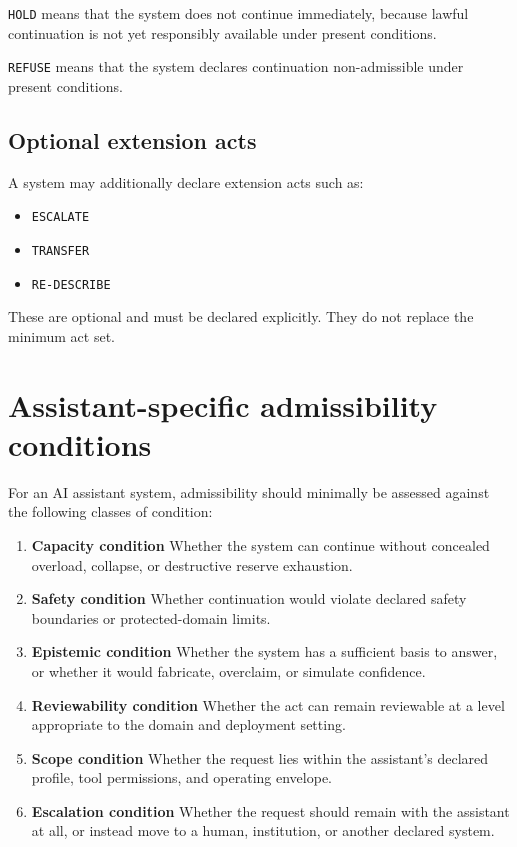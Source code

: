 \documentclass[11pt]{article}
\begin{document}
\texttt{HOLD} means that the system does not continue immediately, because lawful continuation is not yet responsibly available under present conditions.

\texttt{REFUSE} means that the system declares continuation non-admissible under present conditions.

\subsection*{Optional extension acts}

A system may additionally declare extension acts such as:
\begin{itemize}[leftmargin=2em]
    \item \texttt{ESCALATE}
    \item \texttt{TRANSFER}
    \item \texttt{RE-DESCRIBE}
\end{itemize}

These are optional and must be declared explicitly. They do not replace the minimum act set.

\section{Assistant-specific admissibility conditions}

For an AI assistant system, admissibility should minimally be assessed against the following classes of condition:

\begin{enumerate}[leftmargin=2em,label=\arabic*.]
    \item \textbf{Capacity condition}  
    Whether the system can continue without concealed overload, collapse, or destructive reserve exhaustion.

    \item \textbf{Safety condition}  
    Whether continuation would violate declared safety boundaries or protected-domain limits.

    \item \textbf{Epistemic condition}  
    Whether the system has a sufficient basis to answer, or whether it would fabricate, overclaim, or simulate confidence.

    \item \textbf{Reviewability condition}  
    Whether the act can remain reviewable at a level appropriate to the domain and deployment setting.

    \item \textbf{Scope condition}  
    Whether the request lies within the assistant's declared profile, tool permissions, and operating envelope.

    \item \textbf{Escalation condition}  
    Whether the request should remain with the assistant at all, or instead move to a human, institution, or another declared system.
\end{enumerate}
\end{document}
